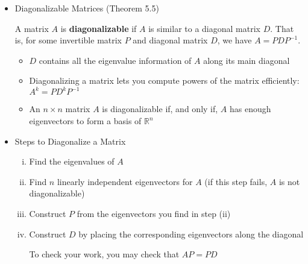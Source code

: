 \documentclass[10pt]{book}
\newenvironment{boxdef}{\begin{mdframed}[backgroundcolor=gray!30,linewidth=0pt,nobreak=true]}{\end{mdframed}}
\newcommand{\R}{\mathbb{R}}
\begin{document}
\begin{itemize}
	\item Diagonalizable Matrices (Theorem 5.5)
		\begin{boxdef}
			A matrix $A$ is \textbf{diagonalizable} if $A$ is similar to a diagonal matrix $D$. That is, for some invertible matrix $P$ and diagonal matrix $D$, we have $A=PDP^{-1}$.
		\end{boxdef}
		\begin{itemize}
			\item $D$ contains all the eigenvalue information of $A$ along its main diagonal
			\item Diagonalizing a matrix lets you compute powers of the matrix efficiently: $ A^k = PD^kP^{-1} $
			\item An $n\times n$ matrix $A$ is diagonalizable if, and only if, $A$ has enough eigenvectors to form a basis of $\R^n$
		\end{itemize}
	\item Steps to Diagonalize a Matrix
		\begin{enumerate}[(i)]
			\item Find the eigenvalues of $A$
			\item Find $n$ linearly independent eigenvectors for $A$ (if this step fails, $A$ is not diagonalizable)
			\item Construct $P$ from the eigenvectors you find in step (ii)
			\item Construct $D$ by placing the corresponding eigenvectors along the diagonal \par
			To check your work, you may check that $AP=PD$
		\end{enumerate}
\end{itemize}
\end{document}
